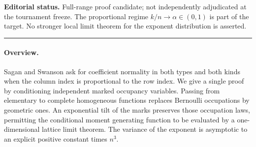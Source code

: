 \documentclass[11pt,a4paper]{article}
\begin{document}
\noindent\textbf{Editorial status.} Full-range proof candidate; not independently adjudicated at the tournament freeze. The proportional regime $k/n\to\alpha\in(0,1)$ is part of the target. No stronger local limit theorem for the exponent distribution is asserted.

\smallskip\hrule\medskip



\begingroup
\newcommand{\E}{\mathbb{E}}\newcommand{\PP}{\mathbb{P}}
\newcommand{\Var}{\operatorname{Var}}\newcommand{\Cov}{\operatorname{Cov}}
\newcommand{\ee}{\mathrm e}
\setcounter{equation}{0}
\renewcommand{\theequation}{\thesection.\arabic{equation}}
\renewcommand{\theHequation}{R20H.\arabic{equation}}
\paragraph{Overview.}
Sagan and Swanson ask for coefficient normality in both types and both kinds when the column index is proportional to the row index. We give a single proof by conditioning independent marked occupancy variables. Passing from elementary to complete homogeneous functions replaces Bernoulli occupations by geometric ones. An exponential tilt of the marks preserves those occupation laws, permitting the conditional moment generating function to be evaluated by a one-dimensional lattice limit theorem. The variance of the exponent is asymptotic to an explicit positive constant times $n^3$.
\end{document}
